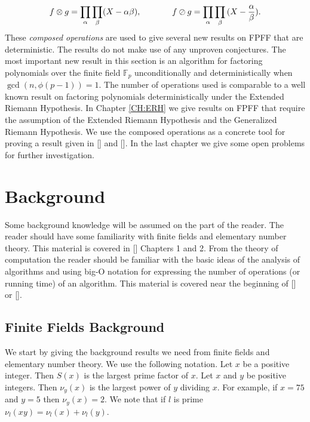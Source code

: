 \documentclass{article}
\let\chapter\section
\theoremstyle{plain}
\theoremstyle{definition}
\def\Fp {{ \mathbb{F} _ {p} }}
\begin{document}
		\[ f \otimes g = \prod_{\alpha}{\prod_{\beta}({X-\alpha\beta})}, 
	      \hspace{13 mm} 
		    f \oslash g = \prod_{\alpha}{\prod_{\beta}{(X-\frac{\alpha}{\beta})}}. \]
		These \emph{composed operations} are used to give several new results on FPFF that are deterministic. The results do not make use of any unproven conjectures. The most important new result in this section is an algorithm for factoring polynomials over the finite field $\Fp$ unconditionally and deterministically when $\gcd(n,\phi(p-1))=1$. The number of operations used is comparable to a well known result on factoring polynomials deterministically under the Extended Riemann Hypothesis. In Chapter \ref{CH:ERH} we give results on FPFF that require the assumption of the Extended Riemann Hypothesis and the Generalized Riemann Hypothesis. We use the composed operations as a concrete tool for proving a result given in [] and []. In the last chapter we give some open problems for further investigation. 
		
\newpage
\chapter{Background}
\label{CH:Background}
		
		Some background knowledge will be assumed on the part of the reader. The reader should have some familiarity with finite fields and elementary number theory. This material is covered in [] Chapters 1 and 2. From the theory of computation the reader should be familiar with the basic ideas of the analysis of algorithms and using big-O notation for expressing the number of operations (or running time) of an algorithm. This material is covered near the beginning of [] or [].
		
		
		\subsection{Finite Fields Background}
		
		We start by giving the background results we need from finite fields and elementary number theory. We use the following notation. Let $x$ be a positive integer. Then $S(x)$ is the largest prime factor of $x$. Let $x$ and $y$ be positive integers. Then $\nu_y(x)$ is the largest power of $y$ dividing $x$. For example, if $x=75$ and $y=5$ then $\nu_y(x)=2$. We note that if $l$ is prime $\nu_l(xy)=\nu_l(x)+\nu_l(y)$. 
		
\end{document}
